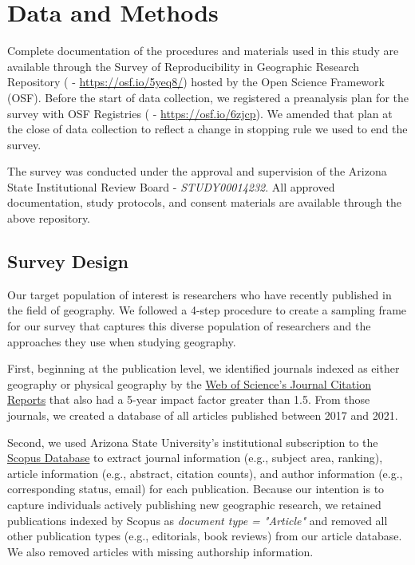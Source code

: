 \documentclass[]{interact}
\theoremstyle{plain}%
\theoremstyle{definition}
\theoremstyle{remark}
\begin{document}
\section*{Data and Methods}
Complete documentation of the procedures and materials used in this study are available through the Survey of Reproducibility in Geographic Research Repository (\citet{Kedron_Holler_Bardin_Hilgendorf_2022} - \url{https://osf.io/5yeq8/}) hosted by the Open Science Framework (OSF). 
Before the start of data collection, we registered a preanalysis plan for the survey with OSF Registries (\citet{Kedron_Survey_PAP} - \url{https://osf.io/6zjcp}). 
We amended that plan at the close of data collection to reflect a change in stopping rule we used to end the survey. 

The survey was conducted under the approval and supervision of the Arizona State Institutional Review Board - \textit{STUDY00014232}.
All approved documentation, study protocols, and consent materials are available through the above repository.

\subsection*{Survey Design}
Our target population of interest is researchers who have recently published in the field of geography. 
We followed a 4-step procedure to create a sampling frame for our survey that captures this diverse population of researchers and the approaches they use when studying geography. 

First, beginning at the publication level, we identified journals indexed as either geography or physical geography by the \href{https://access.clarivate.com/}{Web of Science's Journal Citation Reports} that also had a 5-year impact factor greater than 1.5.
From those journals, we created a database of all articles published between 2017 and 2021.  

Second, we used Arizona State University's institutional subscription to the \href{https://www.scopus.com/home.uri}{Scopus Database} to extract journal information (e.g., subject area, ranking), article information (e.g., abstract, citation counts), and author information (e.g., corresponding status, email) for each publication. 
Because our intention is to capture individuals actively publishing new geographic research, we retained publications indexed by Scopus as \textit{document type = "Article"} and removed all other publication types (e.g., editorials, book reviews) from our article database. 
We also removed articles with missing authorship information. 
\end{document}
